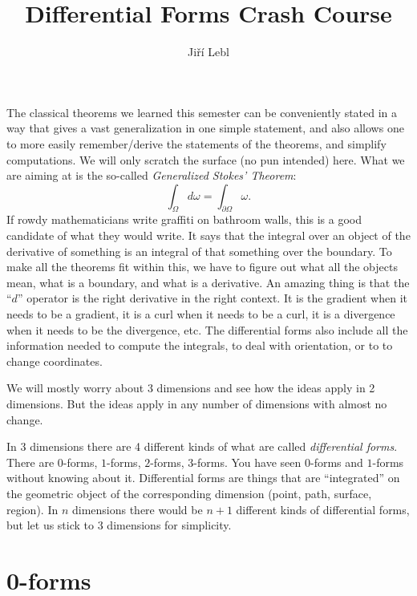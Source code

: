 \documentclass[12pt]{article}
\title{Differential Forms Crash Course}
\author{Ji\v{r}\'i Lebl}
\begin{document}
\maketitle


The classical theorems we learned this semester can be conveniently stated
in a way that gives a vast generalization in one simple statement,
and also allows one to more easily remember/derive the statements of the
theorems, and simplify computations.
We will only scratch the surface (no pun intended) here.  What we are aiming at
is the so-called \emph{Generalized Stokes' Theorem}:
\begin{equation*}
\int_\Omega d \omega = \int_{\partial \Omega} \omega .
\end{equation*}
If rowdy mathematicians write graffiti on bathroom walls, this is a good
candidate of what they would write.
It says that the integral over an object of the derivative of something
is an integral of that something over the boundary.  To make all the theorems
fit within this, we have to figure out what all the objects mean, what is
a boundary, and what is a derivative.  An amazing thing is that
the ``$d$'' operator is the right derivative in the right context.
It is the gradient when it needs to be a gradient, it is a curl when it needs
to be a curl, it is a divergence when it needs to be the divergence, etc.
The differential forms also include all the information needed to compute
the integrals, to deal with orientation, or to to change coordinates.

We will mostly worry about 3 dimensions and see how the ideas apply in 2
dimensions.  But the ideas apply in any number of dimensions with almost
no change.

In 3 dimensions there are 4
different kinds of what are called \emph{differential forms}.
There are $0$-forms, $1$-forms, $2$-forms,
$3$-forms.  You have seen $0$-forms and $1$-forms without knowing
about it.  Differential forms are things that are ``integrated'' on the
geometric object of the corresponding dimension (point, path, surface,
region).  In $n$ dimensions there would be $n+1$ different kinds of
differential forms, but let us stick to 3 dimensions for simplicity.

\section*{0-forms}
\end{document}
